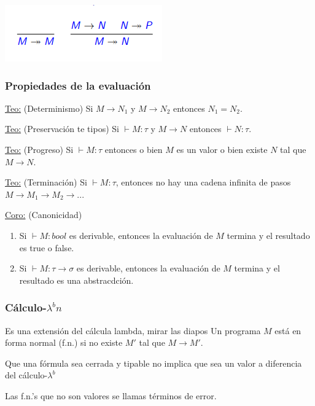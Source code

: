 \documentclass[12pt]{extarticle}
\def\teorema{\underline{Teo:} }
\def\corolario{\underline{Coro:} }
\begin{document}
\begin{center}
\includegraphics[scale=0.6]{reglas-sm3.png}
\end{center}

\subsubsection{Propiedades de la evaluación}

\teorema (Determinismo)
Si $M \rightarrow N_1$ y $M \rightarrow N_2$ entonces $N_1 = N_2$.

\teorema (Preservación te tipos)
Si $\vdash M : \tau$ y $M \rightarrow N$ entonces $\vdash N : \tau$.

\teorema (Progreso)
Si $\vdash M : \tau$ entonces o bien $M$ es un valor o bien existe $N$ tal que $M \rightarrow N$.

\teorema (Terminación)
Si $\vdash M : \tau$, entonces no hay una cadena infinita de pasos $M \rightarrow M_1 \rightarrow M_2 \rightarrow ...$

\corolario (Canonicidad)

\begin{enumerate}
\itemsep-0.35em 
\item Si $\vdash M : bool$ es derivable, entonces la evaluación de $M$ termina y el resultado es true o false.
\item Si $\vdash M : \tau \rightarrow \sigma$ es derivable, entonces la evaluación de $M$ termina y el resultado es una abstracdción.
\end{enumerate}

\subsubsection{Cálculo-$\lambda^bn$}
Es una extensión del cálcula lambda, mirar las diapos
Un programa $M$ está en forma normal (f.n.) si no existe $M'$ tal que $M \rightarrow M'$.

Que una fórmula sea cerrada y tipable no implica que sea un valor a diferencia del cálculo-$\lambda^b$

Las f.n.'s que no son valores se llamas términos de error.
\end{document}
